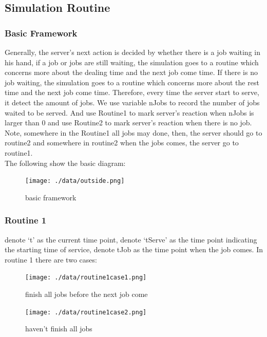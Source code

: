 \documentclass[twoside]{article}
\begin{document}
\subsection{\normalsize{Simulation Routine}}
\begin{multicols}{2}
\subsubsection{Basic Framework}Generally, the server's next action is decided by whether there is a job waiting in his hand, if a job or jobs are still waiting, the simulation goes to a routine which concerns more about the dealing time and the next job come time. If there is no job waiting, the simulation goes to a routine which concerns more about the rest time and the next job come time. Therefore, every time the server start to serve, it detect the amount of jobs. We use variable nJobs to record the number of jobs waited to be served. And use Routine1 to mark server's reaction when nJobs is larger than 0 and use Routine2 to mark server's reaction when there is no job. Note, somewhere in the Routine1 all jobs may done, then, the server should go to routine2 and somewhere in routine2 when the jobs comes, the server go to routine1.\\
The following show the basic diagram: \\ 
\begin{figure}[H]
   \centering
   \texttt{[image: ./data/outside.png]}  
   \caption{basic framework}
\end{figure}
\subsubsection{Routine 1} denote `t' as the current time point, denote `tServe' as the time point indicating the starting time of service, denote tJob as the time point when the job comes. In routine 1 there are two cases: \\
\begin{figure}[H]
   \centering
   \texttt{[image: ./data/routine1case1.png]}  
   \caption{finish all jobs before the next job come}
\end{figure}
\begin{figure}[H]
   \centering
   \texttt{[image: ./data/routine1case2.png]}  
   \caption{haven't finish all jobs}
\end{figure}
\end{multicols}
\end{document}
